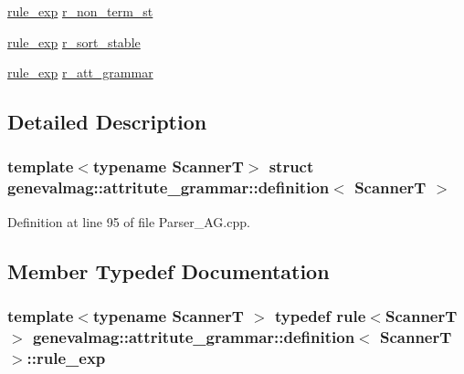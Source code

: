 \begin{DoxyCompactItemize}
\item 
\hyperlink{structgenevalmag_1_1attritute__grammar_1_1definition_ad75a846c3e97a2c46de6cc7bafe5cd86}{rule\_\-exp} \hyperlink{structgenevalmag_1_1attritute__grammar_1_1definition_a35860aafa3d80d2dfa7655088a4950c9}{r\_\-non\_\-term\_\-st}
\item 
\hyperlink{structgenevalmag_1_1attritute__grammar_1_1definition_ad75a846c3e97a2c46de6cc7bafe5cd86}{rule\_\-exp} \hyperlink{structgenevalmag_1_1attritute__grammar_1_1definition_a13d84a11e23110be3df8f860537ec986}{r\_\-sort\_\-stable}
\item 
\hyperlink{structgenevalmag_1_1attritute__grammar_1_1definition_ad75a846c3e97a2c46de6cc7bafe5cd86}{rule\_\-exp} \hyperlink{structgenevalmag_1_1attritute__grammar_1_1definition_a19dd364d3c6344d537f156ef42700d55}{r\_\-att\_\-grammar}
\end{DoxyCompactItemize}


\subsection{Detailed Description}
\subsubsection*{template$<$typename ScannerT$>$ struct genevalmag::attritute\_\-grammar::definition$<$ ScannerT $>$}



Definition at line 95 of file Parser\_\-AG.cpp.



\subsection{Member Typedef Documentation}
\hypertarget{structgenevalmag_1_1attritute__grammar_1_1definition_ad75a846c3e97a2c46de6cc7bafe5cd86}{
\subsubsection[{rule\_\-exp}]{\setlength{\rightskip}{0pt plus 5cm}template$<$typename ScannerT $>$ typedef rule$<$ScannerT$>$ {\bf genevalmag::attritute\_\-grammar::definition}$<$ ScannerT $>$::{\bf rule\_\-exp}}}
\label{structgenevalmag_1_1attritute__grammar_1_1definition_ad75a846c3e97a2c46de6cc7bafe5cd86}


